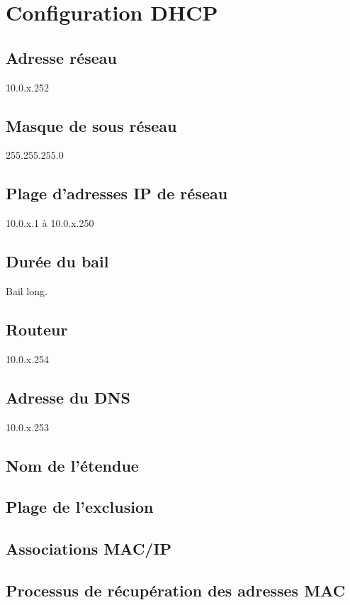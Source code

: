 \section{Configuration DHCP}

\subsection{Adresse réseau}

10.0.x.252

\subsection{Masque de sous réseau}

255.255.255.0

\subsection{Plage d'adresses IP de réseau}

10.0.x.1 à 10.0.x.250

\subsection{Durée du bail}

Bail long.

\subsection{Routeur}

10.0.x.254

\subsection{Adresse du DNS}

10.0.x.253

\subsection{Nom de l'étendue}



\subsection{Plage de l'exclusion}



\subsection{Associations MAC/IP}



\subsection{Processus de récupération des adresses MAC}


